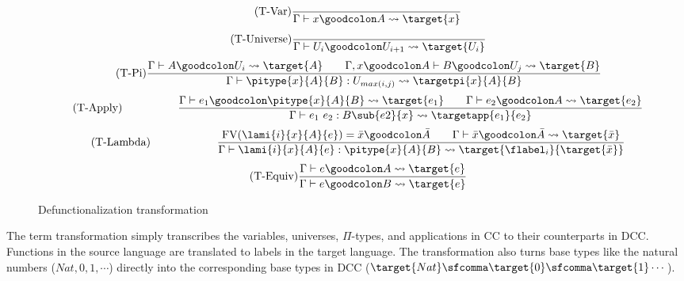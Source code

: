 \begin{figure}
	\begin{equation}
		\tag{T-Var}
		\frac
			{}
			{\Gamma \vdash x \goodcolon A \leadsto \target{x}}
	\end{equation} \hspace{0.5cm}
	\begin{equation}
		\tag{T-Universe}
		\frac
			{}
			{\Gamma \vdash U_i \goodcolon U_{i+1} \leadsto \target{U_i}}
	\end{equation} \hspace{0.5cm}
	\begin{equation}
		\tag{T-Pi}
		\frac
			{\Gamma \vdash A \goodcolon U_i \leadsto \target{A} \qquad \Gamma, x \goodcolon A \vdash B \goodcolon U_j \leadsto \target{B}
			}
			{\Gamma \vdash \pitype{x}{A}{B} \mathrel{:} U_{max(i, j)} \leadsto \targetpi{x}{A}{B}}
	\end{equation} \hspace{0.5cm}
	\begin{equation}
		\tag{T-Apply}
		\qquad\qquad\quad
		\frac
			{\Gamma \vdash e_1 \goodcolon \pitype{x}{A}{B} \leadsto \target{e_1} \qquad \Gamma \vdash e_2 \goodcolon A \leadsto \target{e_2}}
			{\Gamma \vdash e_1 \ e_2 \mathrel{:} B\sub{e2}{x} \leadsto \targetapp{e_1}{e_2}}
	\end{equation} \hspace{0.5cm}
	\begin{equation}
		\tag{T-Lambda}
		\qquad\qquad\qquad
		\frac
			{ \text{FV}(\lami{i}{x}{A}{e}) = \bar{x} \goodcolon \bar{A} \qquad \Gamma \vdash \bar{x} \goodcolon \bar{A} \leadsto \target{\bar{x}} }
			{ \Gamma \vdash \lami{i}{x}{A}{e} \mathrel{:} \pitype{x}{A}{B} \leadsto \target{\flabel_i}\{\target{\bar{x}}\}}
	\end{equation} \hspace{0.5cm}
	\begin{equation}
		\tag{T-Equiv}
		\frac
			{\Gamma \vdash e \goodcolon A \leadsto \target{e}}
			{\Gamma \vdash e \goodcolon B \leadsto \target{e}}
	\end{equation}
	\caption{Defunctionalization transformation}
    \label{fig:dcc transformation}
\end{figure}

The term transformation simply transcribes the variables, universes, $\Pi$-types, and applications in CC to their counterparts in DCC. Functions in the source language are translated to labels in the target language. The transformation also turns base types like the natural numbers ($Nat, 0, 1, \cdots$) directly into the corresponding base types in DCC ($\target{Nat}\sfcomma\target{0}\sfcomma\target{1}\cdots$).

